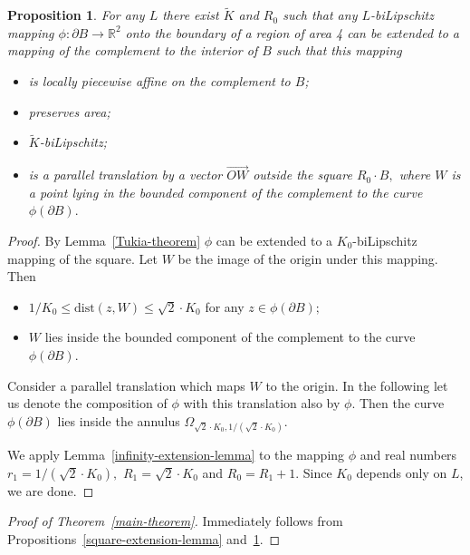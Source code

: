\documentclass[12pt]{article}
\newtheorem{prop}{Proposition}[section]
\theoremstyle{definition}
\begin{document}
\begin{prop}
\label{extension-to-complement-lemma}
For any $L$ there exist $\widetilde K$ and $R_0$ such that any $L$-biLipschitz mapping $\phi:\partial B\to\mathbb R^2$ onto the boundary of a region of area 4 can be extended to a mapping of the complement to the interior of $B$ such that this mapping
\begin{itemize}
\item is locally piecewise affine on the complement to $B$;
\item preserves area;
\item $\widetilde K$-biLipschitz;
\item is a parallel translation by a vector $\overrightarrow{OW}$ outside the square $R_0\cdot B,$ where $W$ is a point lying in the bounded component of the complement to the curve $\phi(\partial B).$
\end{itemize}
\end{prop}

\begin{proof}
By Lemma~\ref{Tukia-theorem} $\phi$ can be extended to a $K_0$-biLipschitz mapping of the square. Let $W$ be the image of the origin under this mapping. Then
\begin{itemize}
\item
$1/K_0 \le \mathrm{dist}(z, W) \le \sqrt2\cdot K_0$ for any $z\in\phi(\partial B);$
\item
$W$ lies inside the bounded component of the complement to the curve $\phi(\partial B).$
\end{itemize}

Consider a parallel translation which maps $W$ to the origin. In the following let us  denote the composition of $\phi$ with this translation also by $\phi.$ Then the curve $\phi(\partial B)$ lies inside the annulus $\Omega_{\sqrt{2}\cdot K_0, 1/\left(\sqrt{2}\cdot K_0\right)}.$

We apply Lemma~\ref{infinity-extension-lemma} to the mapping $\phi$ and real numbers $r_1 = 1/\left(\sqrt{2}\cdot K_0\right),$ $R_1 = \sqrt{2}\cdot K_0$ and $R_0 = R_1 + 1.$ Since $K_0$ depends only on $L$, we are done.

\end{proof}

\begin{proof}[Proof of Theorem~\ref{main-theorem}]
Immediately follows from Propositions~\ref{square-extension-lemma} and~\ref{extension-to-complement-lemma}.
\end{proof}
\end{document}
